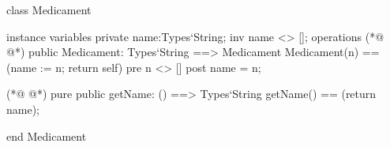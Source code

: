 \begin{vdmpp}[breaklines=true]
class Medicament

instance variables
  private name:Types`String;
  inv name <> [];
operations
(*@
\label{Medicament:7}
@*)
 public Medicament: Types`String ==> Medicament
  Medicament(n) == (name := n; return self)
 pre n <> []
 post name = n;
 
(*@
\label{getName:12}
@*)
 pure public getName: () ==> Types`String
  getName() == (return name);

end Medicament
\end{vdmpp}
